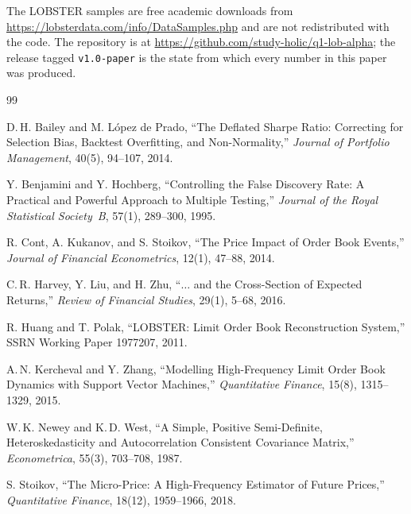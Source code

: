 \documentclass[11pt]{scrartcl}
\begin{document}
The LOBSTER samples are free academic downloads from \url{https://lobsterdata.com/info/DataSamples.php} and are not redistributed with the code. The repository is at \url{https://github.com/study-holic/q1-lob-alpha}; the release tagged \texttt{v1.0-paper} is the state from which every number in this paper was produced.

\newpage
\begin{thebibliography}{99}

D.\,H. Bailey and M. L\'opez de Prado,
``The Deflated Sharpe Ratio: Correcting for Selection Bias, Backtest Overfitting, and Non-Normality,''
\textit{Journal of Portfolio Management}, 40(5), 94--107, 2014.

Y. Benjamini and Y. Hochberg,
``Controlling the False Discovery Rate: A Practical and Powerful Approach to Multiple Testing,''
\textit{Journal of the Royal Statistical Society~B}, 57(1), 289--300, 1995.

R. Cont, A. Kukanov, and S. Stoikov,
``The Price Impact of Order Book Events,''
\textit{Journal of Financial Econometrics}, 12(1), 47--88, 2014.

C.\,R. Harvey, Y. Liu, and H. Zhu,
``$\ldots$ and the Cross-Section of Expected Returns,''
\textit{Review of Financial Studies}, 29(1), 5--68, 2016.

R. Huang and T. Polak,
``LOBSTER: Limit Order Book Reconstruction System,''
SSRN Working Paper 1977207, 2011.

A.\,N. Kercheval and Y. Zhang,
``Modelling High-Frequency Limit Order Book Dynamics with Support Vector Machines,''
\textit{Quantitative Finance}, 15(8), 1315--1329, 2015.

W.\,K. Newey and K.\,D. West,
``A Simple, Positive Semi-Definite, Heteroskedasticity and Autocorrelation Consistent Covariance Matrix,''
\textit{Econometrica}, 55(3), 703--708, 1987.

S. Stoikov,
``The Micro-Price: A High-Frequency Estimator of Future Prices,''
\textit{Quantitative Finance}, 18(12), 1959--1966, 2018.

\end{thebibliography}
\end{document}
